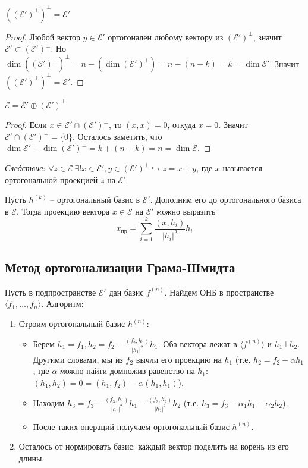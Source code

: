 \begin{proposition}
    $((\mathcal{E'})^{\bot})^{\bot}=\mathcal{E'}$
\end{proposition}
\begin{proof}
    Любой вектор $y\in \mathcal{E}'$ ортогонален любому вектору из $(\mathcal{E'})^{\bot}$, значит $\mathcal{E}'\subset (\mathcal{E'})^{\bot}$. Но $\dim ((\mathcal{E'})^{\bot})^{\bot}=n-(\dim (\mathcal{E'})^{\bot})=n -(n-k)=k=\dim \mathcal{E}'$. Значит $((\mathcal{E'})^{\bot})^{\bot}=\mathcal{E}'$.
\end{proof}
\begin{proposition}
    $\mathcal{E}=\mathcal{E}'\oplus (\mathcal{E'})^{\bot}$
\end{proposition}
\begin{proof}
    Если $x\in\mathcal{E}'\cap (\mathcal{E'})^{\bot}$, то $(x,x)=0$, откуда $x=0$. Значит $\mathcal{E}'\cap (\mathcal{E'})^{\bot}=\{0\}$. Осталось заметить, что $\dim \mathcal{E}'+\dim (\mathcal{E'})^{\bot}=k+(n-k)=n=\dim \mathcal{E}$.
\end{proof}
\textit{Следствие}: $\forall z\in \mathcal{E}\ \exists! x\in \mathcal{E}', y\in (\mathcal{E'})^{\bot} \hookrightarrow z=x+y$, где $x$ называется ортогональной проекцией $z$ на $\mathcal{E}'$.

Пусть $h^{(k)}$ -- ортогональный базис в $\mathcal{E}'$. Дополним его до ортогонального базиса в $\mathcal{E}$. Тогда проекцию вектора $x\in \mathcal{E}$ на $\mathcal{E}'$ можно выразить
\[
x_{\text{пр}}=\sum_{i=1}^k\frac{(x, h_i)}{|h_i|^2}h_i
\]
\subsection{Метод ортогонализации Грама-Шмидта}
Пусть в подпространстве $\mathcal{E}'$ дан базис $f^{(n)}$. Найдем ОНБ в пространстве $\langle f_1, \dots, f_n\rangle$. Алгоритм:
\begin{enumerate}
    \item Строим ортогональный базис $h^{(n)}$:
    \begin{itemize}
        \item Берем $h_1=f_1, h_2=f_2-\frac{(f_2,h_1)}{|h_1|^2}h_1$. Оба вектора лежат в $\langle f^{(n)}\rangle$ и $h_1\bot h_2$. Другими словами, мы из $f_2$ вычли его проекцию на $h_1$ (т.е. $h_2=f_2-\alpha h_1$, где $\alpha$ можно найти домножив равенство на $h_1$: $(h_1,h_2)=0=(h_1,f_2)-\alpha(h_1,h_1)$).
        \item Находим $h_3=f_3-\frac{(f_3,h_1)}{|h_1|^2}h_1-\frac{(f_3,h_2)}{|h_2|^2}h_2$ (т.е. $h_3=f_3-\alpha_1h_1-\alpha_2h_2$).
        \item После таких операций получаем ортогональный базис $h^{(n)}$.
    \end{itemize}
    \item Осталось от нормировать базис: каждый вектор поделить на корень из его длины.
\end{enumerate}

